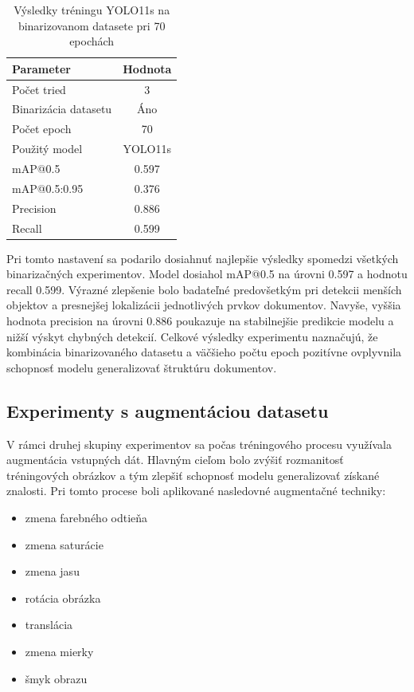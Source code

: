             \begin{table}[H]
                \centering
                \begin{tabular}{|l|c|}
                \hline
                \textbf{Parameter} & \textbf{Hodnota} \\ \hline
                Počet tried & 3 \\ \hline
                Binarizácia datasetu & Áno \\ \hline
                Počet epoch & 70 \\ \hline
                Použitý model & YOLO11s \\ \hline
                mAP@0.5 & 0.597 \\ \hline
                mAP@0.5:0.95 & 0.376 \\ \hline
                Precision & 0.886 \\ \hline
                Recall & 0.599 \\ \hline
                \end{tabular}
                \caption{Výsledky tréningu YOLO11s na binarizovanom datasete pri 70 epochách}
                \label{tab:yolo11s_binary_70}
            \end{table}

            Pri tomto nastavení sa podarilo dosiahnuť najlepšie výsledky spomedzi všetkých binarizačných experimentov. Model dosiahol mAP@0.5 na úrovni 0.597 a hodnotu recall 0.599. Výrazné zlepšenie bolo badateľné predovšetkým pri detekcii menších objektov a presnejšej lokalizácii jednotlivých prvkov dokumentov. Navyše, vyššia hodnota precision na úrovni 0.886 poukazuje na stabilnejšie predikcie modelu a nižší výskyt chybných detekcií. Celkové výsledky experimentu naznačujú, že kombinácia binarizovaného datasetu a väčšieho počtu epoch pozitívne ovplyvnila schopnosť modelu generalizovať štruktúru dokumentov.

    \subsection{Experimenty s augmentáciou datasetu}
            V rámci druhej skupiny experimentov sa počas tréningového procesu využívala augmentácia vstupných dát. Hlavným cieľom bolo zvýšiť rozmanitosť tréningových obrázkov a tým zlepšiť schopnosť modelu generalizovať získané znalosti. Pri tomto procese boli aplikované nasledovné augmentačné techniky:

            \begin{itemize}
                \item zmena farebného odtieňa
                \item zmena saturácie
                \item zmena jasu
                \item rotácia obrázka
                \item translácia
                \item zmena mierky
                \item šmyk obrazu
            \end{itemize}

